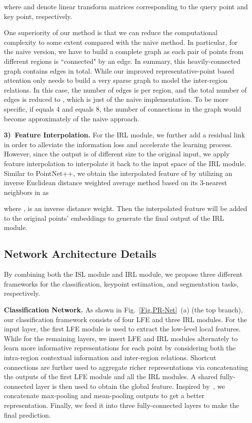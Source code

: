 \documentclass[journal]{IEEEtran}
\begin{document}
where  and  denote linear transform matrices corresponding to the query point and key point, respectively.

One superiority of our method is that we can reduce the computational complexity to some extent compared with the naive method. In particular, for the naive version, we have to build a complete graph as each pair of points from different regions is ``connected" by an edge. In summary, this heavily-connected graph contains  edges in total. While our improved representative-point based attention only needs to build a very sparse graph to model the inter-region relations. In this case, the number of edges is  per region, and the total number of edges is reduced to , which is just  of the naive implementation. To be more specific, if  equals 4 and  equals 8, the number of connections in the graph would become approximately  of the naive approach. 


\textbf{3)~Feature Interpolation.}  
For the IRL module, we further add a residual link in order to alleviate the information loss and accelerate the learning process. However, since the output is of different size to the original input, we apply feature interpolation to interpolate it back to the input space of the IRL module.
Similar to PointNet++, we obtain the interpolated feature  of  by utilizing an inverse Euclidean distance weighted average method based on its 3-nearest neighbors  in  as


where ,  is an inverse  distance weight. Then the interpolated feature will be added to the original points' embeddings to generate the final output of the IRL module.

\subsection{Network Architecture Details} 



By combining both the ISL module and IRL module, we propose three different frameworks for the classification, keypoint estimation, and segmentation tasks, respectively. 

\noindent\textbf{Classification Network.} As shown in Fig.~\ref{Fig.PR-Net}~(a) (the top branch), our classification framework consists of four LFE and three IRL modules. For the input layer, the first LFE module is used to extract the low-level local features. While for the remaining layers, we insert LFE and IRL modules alternately to learn more informative representations for each point by considering both the intra-region contextual information and inter-region relations.
Shortcut connections are further used to aggregate richer representations via concatenating the outputs of the first LFE module and all the IRL modules. A shared fully-connected layer is then used to obtain the global feature. Inspired by~\cite{woo2018cbam}, we concatenate max-pooling and mean-pooling outputs to get a better representation. Finally, we feed it into three fully-connected layers to make the final prediction.
\end{document}
